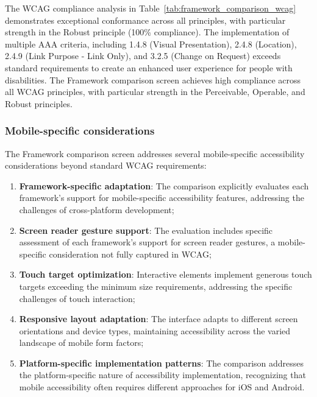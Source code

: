 The WCAG compliance analysis in Table~\ref{tab:framework_comparison_wcag} demonstrates exceptional conformance across all principles, with particular strength in the Robust principle (100\% compliance). The implementation of multiple AAA criteria, including 1.4.8 (Visual Presentation), 2.4.8 (Location), 2.4.9 (Link Purpose - Link Only), and 3.2.5 (Change on Request) exceeds standard requirements to create an enhanced user experience for people with disabilities. 
The Framework comparison screen achieves high compliance across all WCAG principles, with particular strength in the Perceivable, Operable, and Robust principles.

\subsubsection{Mobile-specific considerations}

The Framework comparison screen addresses several mobile-specific accessibility considerations beyond standard WCAG requirements:

\begin{enumerate}
    \item \textbf{Framework-specific adaptation}: The comparison explicitly evaluates each framework's support for mobile-specific accessibility features, addressing the challenges of cross-platform development;
    
    \item \textbf{Screen reader gesture support}: The evaluation includes specific assessment of each framework's support for screen reader gestures, a mobile-specific consideration not fully captured in WCAG;
    
    \item \textbf{Touch target optimization}: Interactive elements implement generous touch targets exceeding the minimum size requirements, addressing the specific challenges of touch interaction;
    
    \item \textbf{Responsive layout adaptation}: The interface adapts to different screen orientations and device types, maintaining accessibility across the varied landscape of mobile form factors;
    
    \item \textbf{Platform-specific implementation patterns}: The comparison addresses the platform-specific nature of accessibility implementation, recognizing that mobile accessibility often requires different approaches for iOS and Android.
\end{enumerate}

